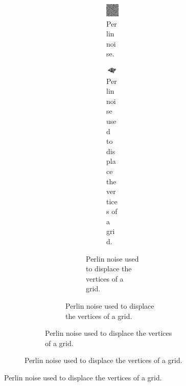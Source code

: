 \documentclass{article}
\begin{document}
\begin{figure}[H]
\begin{figure}[H]
\begin{figure}[H]
\begin{figure}[H]
\begin{figure}[H]
	\centering
	\begin{subfigure}[h]{0.35\textwidth}
		\includegraphics[width=\textwidth]{img/perlin_noise.png}
		\caption{Perlin noise.}
		\label{fig:pnoise}
	\end{subfigure}
	\hfill
	\begin{subfigure}[h]{0.55\textwidth}
		\includegraphics[width=\textwidth]{img/perlin_terrain.png}
		\caption{Perlin noise used to displace the vertices of a grid.}
		\label{fig:pterrain}
	\end{subfigure}
\end{figure}


\end{figure}
\end{figure}
\end{figure}
\end{figure}
\end{document}
